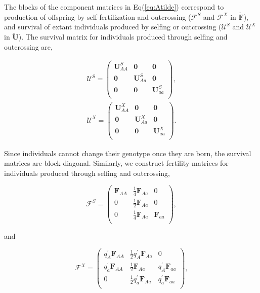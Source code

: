 \documentclass[11pt]{article}
\def\mbf#1{\mathbf{#1}}
\def\mcal#1{\mathcal{#1}}
\begin{document}
The blocks of the component matrices in Eq(\ref{eq:Atilde}) correspond to production of offspring by self-fertilization and outcrossing ($\mcal{F}^S$ and $\mcal{F}^X$ in $\tilde{\mbf{F}}$), and survival of extant individuals produced by selfing or outcrossing ($\mcal{U}^S$ and $\mcal{U}^X$ in $\tilde{\mbf{U}}$). The survival matrix for individuals produced through selfing and outcrossing are,
\begin{linenomath*}
\begin{eqnarray} 
	\mcal{U}^S  = 
		\left(
			\begin{array}{ccc}
				\mbf{U}^{S}_{AA} & \mbf{0} & \mbf{0} \\
				\mbf{0} & \mbf{U}^{S}_{Aa} & \mbf{0} \\
				\mbf{0} & \mbf{0} & \mbf{U}^{S}_{aa} \\
			\end{array} \right),\label{eq:BlkUS}\\
				\mcal{U}^X  = 
		\left(
			\begin{array}{ccc}
				\mbf{U}^{X}_{AA} & \mbf{0} & \mbf{0} \\
				\mbf{0} & \mbf{U}^{X}_{Aa} & \mbf{0} \\
				\mbf{0} & \mbf{0} & \mbf{U}^{X}_{aa} \\
			\end{array} \right).\label{eq:BlkUX}
\end{eqnarray}
\end{linenomath*}
Since individuals cannot change their genotype once they are born, the survival matrices are block diagonal.  Similarly, we construct fertility matrices for individuals produced through selfing and outcrossing, 
\begin{linenomath*}
\begin{equation} \label{eq:BlkFS}
	\mcal{F}^S = 
			\left(
			\begin{array}{ccc}
				\mbf{F}_{AA} & \frac{1}{4} \mbf{F}_{Aa} & 0 \\
				0 & \frac{1}{2} \mbf{F}_{Aa} & 0 \\
				0 & \frac{1}{4} \mbf{F}_{Aa} & \mbf{F}_{aa}\\
			\end{array} \right), 
\end{equation}
\end{linenomath*}
\noindent and 
\begin{linenomath*}
\begin{equation} \label{eq:BlkFX}
	\mcal{F}^X = 
			\left(
			\begin{array}{ccc}
				q^{\prime}_{A} \mbf{F}_{AA} & \frac{1}{2} q^{\prime}_{A} \mbf{F}_{Aa} & 0 \\ 
				q^{\prime}_{a} \mbf{F}_{AA} & \frac{1}{2} \mbf{F}_{Aa} & q^{\prime}_{A} \mbf{F}_{aa}  \\ 
				0 & \frac{1}{2} q^{\prime}_{a} \mbf{F}_{Aa} & q^{\prime}_{a} \mbf{F}_{aa}  \\
			\end{array} \right),
\end{equation}
\end{linenomath*}
\end{document}
